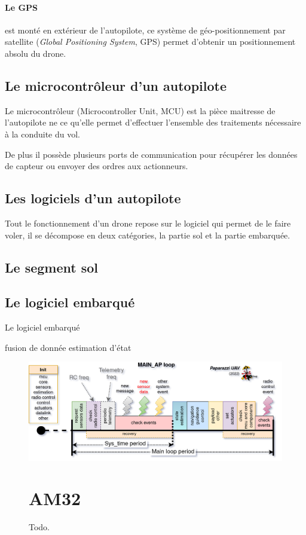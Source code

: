  \paragraph{Le GPS}est monté en extérieur de l'autopilote, ce système de géo-positionnement par satellite (\textit{Global Positioning System}, GPS)  permet d'obtenir un positionnement absolu du drone. 

 \subsection{Le microcontrôleur d'un autopilote}

 Le microcontrôleur (Microcontroller Unit, MCU)  est la pièce maitresse de l'autopilote ne ce qu'elle permet d'effectuer l'ensemble des traitements nécessaire à la conduite du vol.

 De plus il possède plusieurs ports de communication pour récupérer les données de capteur ou envoyer des ordres aux actionneurs.


 \subsection{Les logiciels d'un autopilote}
 Tout le fonctionnement d'un drone repose sur le logiciel qui permet de le faire voler, il se décompose en deux catégories, la partie sol et la partie embarquée.

 \subsection{Le segment sol}

 \subsection{Le logiciel embarqué}
 Le logiciel embarqué 

 fusion de donnée 
 estimation d'état 

 \begin{figure}[ht!]
    \centerline{
    \includegraphics[trim=0cm 0cm 0cm 0cm,clip,width=1\columnwidth]{figures/PPRZ_Main_ap_loop.png}}
    \caption{Todo.}
    \label{fig:schedulingpaparazzi}

\section{AM32}


\end{figure}
